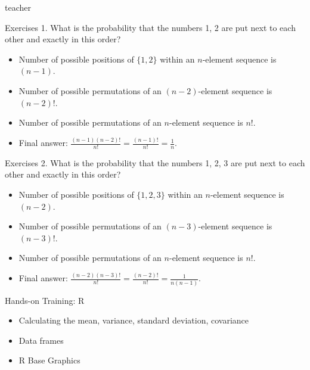 \begin{shownto}{teacher}
    \begin{frame}{Exercises}
        1. What is the probability that the numbers 1, 2 are put next to each other and exactly in this order?
        \medskip
        
        \begin{itemize}
            \item Number of possible positions of $\{1,2\}$ within an $n$-element sequence is $(n-1)$.
            \item Number of possible permutations of an $(n-2)$-element sequence is $(n-2)!$.
            \item Number of possible permutations of an $n$-element sequence is $n!$.
            \item Final answer: $\frac{(n-1)(n-2)!}{n!} = \frac{(n-1)!}{n!} = \frac{1}{n}$.
        \end{itemize}
    \end{frame}

    \begin{frame}{Exercises}
        2. What is the probability that the numbers 1, 2, 3 are put next to each other and exactly in this order?
        \medskip
        
        \begin{itemize}
            \item Number of possible positions of $\{1,2,3\}$ within an $n$-element sequence is $(n-2)$.
            \item Number of possible permutations of an $(n-3)$-element sequence is $(n-3)!$.
            \item Number of possible permutations of an $n$-element sequence is $n!$.
            \item Final answer: $\frac{(n-2)(n-3)!}{n!} = \frac{(n-2)!}{n!} = \frac{1}{n(n-1)}$.
        \end{itemize}
    \end{frame}

\end{shownto}

\begin{frame}{Hands-on Training: R}
    \begin{itemize}
        \item Calculating the mean, variance, standard deviation, covariance
        \item Data frames
        \item R Base Graphics
    \end{itemize}
\end{frame}

